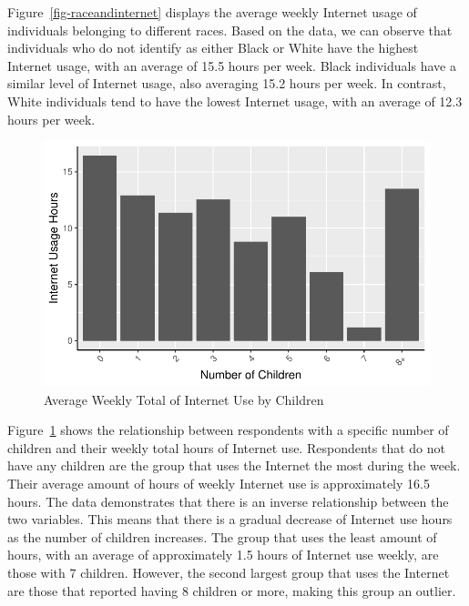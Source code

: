 \documentclass[
]{article}
\begin{document}
Figure~\ref{fig-raceandinternet} displays the average weekly Internet
usage of individuals belonging to different races. Based on the data, we
can observe that individuals who do not identify as either Black or
White have the highest Internet usage, with an average of 15.5 hours per
week. Black individuals have a similar level of Internet usage, also
averaging 15.2 hours per week. In contrast, White individuals tend to
have the lowest Internet usage, with an average of 12.3 hours per week.

\begin{figure}

{\centering \includegraphics{paper_files/figure-pdf/fig-childrenandinternet-1.pdf}

}

\caption{\label{fig-childrenandinternet}Average Weekly Total of Internet
Use by Children}

\end{figure}

Figure~\ref{fig-childrenandinternet} shows the relationship between
respondents with a specific number of children and their weekly total
hours of Internet use. Respondents that do not have any children are the
group that uses the Internet the most during the week. Their average
amount of hours of weekly Internet use is approximately 16.5 hours. The
data demonstrates that there is an inverse relationship between the two
variables. This means that there is a gradual decrease of Internet use
hours as the number of children increases. The group that uses the least
amount of hours, with an average of approximately 1.5 hours of Internet
use weekly, are those with 7 children. However, the second largest group
that uses the Internet are those that reported having 8 children or
more, making this group an outlier.
\end{document}

